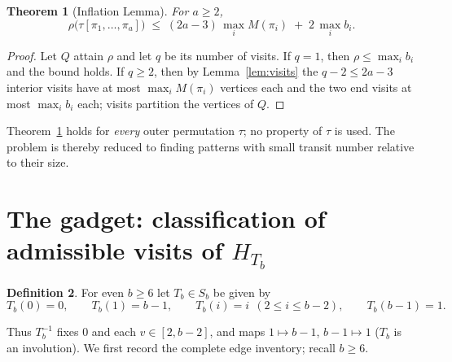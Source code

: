 \documentclass[11pt]{article}
\newtheorem{theorem}{Theorem}[section]
\theoremstyle{definition}
\newtheorem{definition}[theorem]{Definition}
\newcommand{\inv}[1]{#1^{-1}}
\begin{document}
\begin{theorem}[Inflation Lemma]\label{thm:inflation}
For $a \ge 2$,
\[
\rho\bigl(\tau[\pi_1, \dots, \pi_a]\bigr)
\;\le\;
(2a - 3)\,\max_i M(\pi_i) \;+\; 2\,\max_i b_i .
\]
\end{theorem}

\begin{proof}
Let $Q$ attain $\rho$ and let $q$ be its number of visits. If $q = 1$, then
$\rho \le \max_i b_i$ and the bound holds. If $q \ge 2$, then by
Lemma~\ref{lem:visits} the $q - 2 \le 2a - 3$ interior visits have at most
$\max_i M(\pi_i)$ vertices each and the two end visits at most $\max_i b_i$ each;
visits partition the vertices of $Q$.
\end{proof}

Theorem~\ref{thm:inflation} holds for \emph{every} outer permutation $\tau$; no
property of $\tau$ is used. The problem is thereby reduced to finding patterns with
small transit number relative to their size.

\section{The gadget: classification of admissible visits of
$H_{T_b}$}\label{sec:gadget}

\begin{definition}\label{def:Tb}
For even $b \ge 6$ let $T_b \in S_b$ be given by
\[
T_b(0) = 0, \qquad T_b(1) = b-1, \qquad T_b(i) = i \ \ (2 \le i \le b-2), \qquad
T_b(b-1) = 1 .
\]
\end{definition}

Thus $\inv{T_b}$ fixes $0$ and each $v \in [2, b-2]$, and maps $1 \mapsto b-1$,
$b-1 \mapsto 1$ ($T_b$ is an involution). We first record the complete edge
inventory; recall $b \ge 6$.
\end{document}
